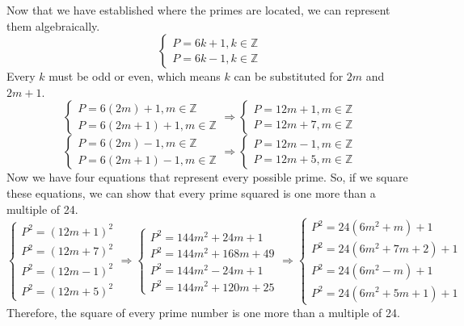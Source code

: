\noindent{}Now that we have established where the primes are located, we can represent them algebraically.
\[
    \begin{cases}
    P = 6k + 1, k \in \mathbb{Z} \\
    P = 6k - 1, k \in \mathbb{Z}
    \end{cases}
\]
Every \(k\) must be odd or even, which means \(k\) can be substituted for \(2m\) and \(2m +1\).
\[
  \begin{cases}
    P = 6(2m) + 1, m \in \mathbb{Z} \\
    P = 6(2m + 1) + 1, m \in \mathbb{Z}
  \end{cases} \Longrightarrow \begin{cases}
    P = 12m + 1, m \in \mathbb{Z} \\
    P = 12m + 7, m \in \mathbb{Z}
  \end{cases}
\]
\[
  \begin{cases}
    P = 6(2m) - 1, m \in \mathbb{Z} \\
    P = 6(2m + 1) - 1, m \in \mathbb{Z}
  \end{cases} \Longrightarrow \begin{cases}
    P = 12m - 1, m \in \mathbb{Z} \\
    P = 12m + 5, m \in \mathbb{Z}
  \end{cases}
\]
Now we have four equations that represent every possible prime. So, if we square these equations, we can show that every prime squared is one more than a multiple of 24.
\[
    \begin{cases}
        P^2 = {(12m + 1)}^2 \\
        P^2 = {(12m + 7)}^2 \\
        P^2 = {(12m - 1)}^2 \\
        P^2 = {(12m + 5)}^2
    \end{cases} \Longrightarrow \begin{cases}
        P^2 = 144m^2 + 24m + 1 \\
        P^2 = 144m^2 + 168m + 49 \\
        P^2 = 144m^2 - 24m + 1 \\
        P^2 = 144m^2 + 120m + 25
    \end{cases} \Longrightarrow \begin{cases}
        P^2 = 24(6m^2 + m) + 1 \\
        P^2 = 24(6m^2 + 7m + 2) + 1 \\
        P^2 = 24(6m^2 - m) + 1 \\
        P^2 = 24(6m^2 + 5m + 1) + 1
    \end{cases}
\]
Therefore, the square of every prime number is one more than a multiple of 24. 

